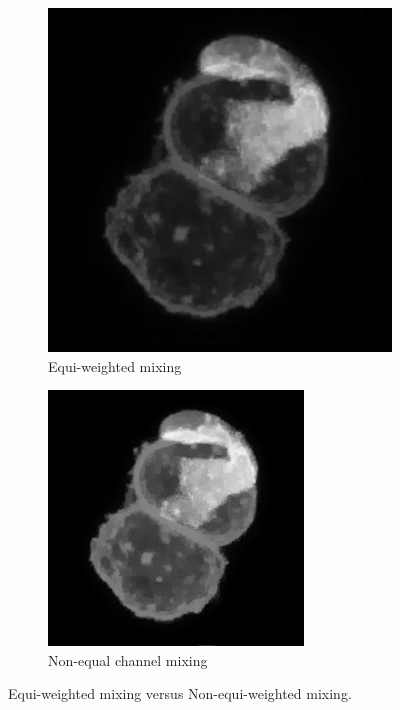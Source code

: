 \documentclass[a4paper,11pt]{ijamas}
\begin{document}
\begin{figure}[!h]
\centering
\begin{subfigure}{.48\textwidth}
  \centering
  \includegraphics[width=0.80\columnwidth]{./figs/2bRG.jpg}
 \caption{Equi-weighted mixing}
  \label{fig:equimix}
\end{subfigure}%
\begin{subfigure}{.48\textwidth}
  \centering
  \includegraphics[width=0.80\columnwidth]{./figs/2remapped.jpg}
 \caption{Non-equal channel mixing}
  \label{fig:ampcurve}
\end{subfigure}%
\caption{Equi-weighted mixing versus Non-equi-weighted mixing.}
\label{fig:mixingchannels}
\end{figure}
\end{document}
